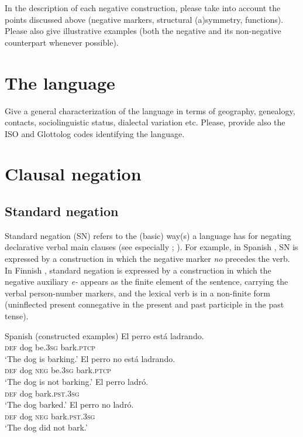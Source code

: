 \documentclass[output=paper,colorlinks,citecolor=brown]{langscibook}
\begin{document}
In the description of each negative construction, please take into account the points discussed above (negative markers, structural (a)symmetry, functions). Please also give illustrative examples (both the negative and its non-negative counterpart whenever possible). 

\section{The language}\label{sec:quest:1}

Give a general characterization of the language in terms of geography, genealogy, contacts, sociolinguistic status, dialectal variation etc. Please, provide also the ISO and Glottolog codes identifying the language.


\section{Clausal negation}\label{sec:quest:2}
\subsection{Standard negation}\label{sec:quest:2.1}

Standard negation (SN) refers to the (basic) way(s) a language has for negating declarative verbal main clauses (see especially \citealt{Payne1985}; \citealt{Miestamo2005}). For example, in Spanish , SN is expressed by a construction in which the negative marker \textit{no} precedes the verb. In Finnish , standard negation is expressed by a construction in which the negative auxiliary \textit{e-} appears as the finite element of the sentence, carrying the verbal person-number markers, and the lexical verb is in a non-finite form (uninflected present connegative in the present and past participle in the past tense).

\ea\label{ex:quest:1}Spanish (constructed examples)
    \ea\label{ex:quest:1a}
        \gll El perro está ladrando. \\ 
             \textsc{def} dog be.\textsc{3sg} bark.\textsc{ptcp} \\
        \glt ‘The dog is barking.’ 
    \ex\label{ex:quest:1b}
        \gll El perro no está ladrando. \\
             \textsc{def} dog \textsc{neg} be.\textsc{3sg} bark.\textsc{ptcp}\\
        \glt ‘The dog is not barking.’
    \ex\label{ex:quest:1c}
        \gll El perro ladró. \\ 
             \textsc{def} dog bark.\textsc{pst.3sg} \\
        \glt ‘The dog barked.’
    \ex\label{ex:quest:1d}
        \gll El perro no ladró. \\
             \textsc{def} dog \textsc{neg} bark.\textsc{pst.3sg} \\
        \glt ‘The dog did not bark.’
    \z
\z 
\end{document}
